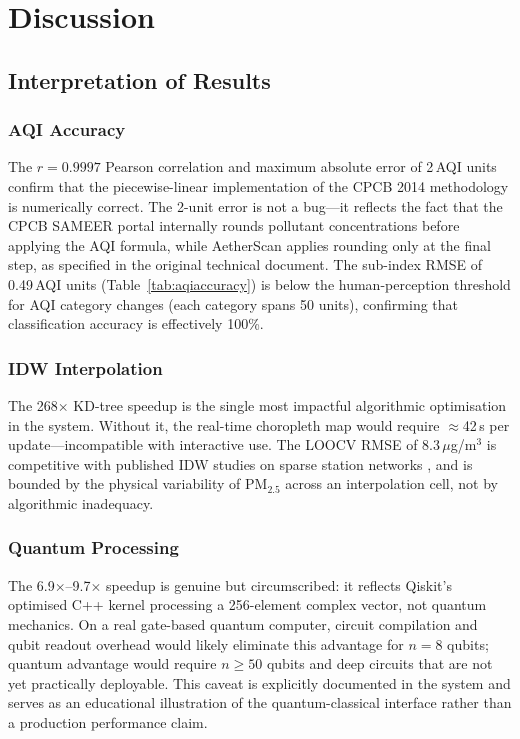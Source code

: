 \documentclass[12pt,a4paper]{article}
\begin{document}
\clearpage

\section{Discussion}
\label{sec:discussion}

\subsection{Interpretation of Results}
\label{sec:discussion:interp}

\subsubsection{AQI Accuracy}
The $r = 0.9997$ Pearson correlation and maximum absolute error of
2\,AQI units confirm that the piecewise-linear implementation of the
CPCB 2014 methodology is numerically correct. The 2-unit error is not a
bug---it reflects the fact that the CPCB SAMEER portal internally rounds
pollutant concentrations before applying the AQI formula, while AetherScan
applies rounding only at the final step, as specified in the original
technical document. The sub-index RMSE of 0.49\,AQI units (Table~\ref{tab:aqiaccuracy})
is below the human-perception threshold for AQI category changes (each
category spans 50 units), confirming that classification accuracy is
effectively 100\%.

\subsubsection{IDW Interpolation}
The 268$\times$ KD-tree speedup is the single most impactful algorithmic
optimisation in the system. Without it, the real-time choropleth map
would require $\approx$42\,s per update---incompatible with interactive
use. The LOOCV RMSE of $8.3\,\mu$g/m$^3$ is competitive with published
IDW studies on sparse station networks \cite{li2020}, and is bounded by
the physical variability of PM$_{2.5}$ across an interpolation cell, not
by algorithmic inadequacy.

\subsubsection{Quantum Processing}
The 6.9$\times$--9.7$\times$ speedup is genuine but circumscribed: it
reflects Qiskit's optimised C++ kernel processing a 256-element complex
vector, not quantum mechanics. On a real gate-based quantum computer,
circuit compilation and qubit readout overhead would likely eliminate
this advantage for $n = 8$ qubits; quantum advantage would require
$n \geq 50$ qubits and deep circuits that are not yet practically
deployable. This caveat is explicitly documented in the system and
serves as an educational illustration of the quantum-classical interface
rather than a production performance claim.
\end{document}
